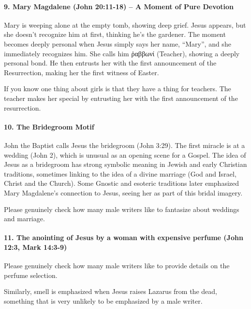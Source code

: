 \paragraph{9.
Mary Magdalene (John 20:11-18) -- A Moment of Pure Devotion}\label{par:mary-magdalene-john-2011-18-a-moment-of-pure-devotion}

Mary is weeping alone at the empty tomb, showing deep grief.
Jesus appears, but she doesn't recognize him at first, thinking he's the gardener.
The moment becomes deeply personal when Jesus simply says her name, ``Mary'', and she immediately recognizes him.
She calls him ῥαββωνί (Teacher), showing a deeply personal bond.
He then entrusts her with the first announcement of the Resurrection, making her the first witness of Easter.

If you know one thing about girls is that they have a thing for teachers.
The teacher makes her special by entrusting her with the first announcement of the resurrection.

\paragraph{10.
The Bridegroom Motif}\label{par:the-bridegroom-motif}

John the Baptist calls Jesus the bridegroom (John 3:29).
The first miracle is at a wedding (John 2), which is unusual as an opening scene for a Gospel.
The idea of Jesus as a bridegroom has strong symbolic meaning in Jewish and early Christian traditions, sometimes linking to the idea of a divine marriage (God and Israel, Christ and the Church).
Some Gnostic and esoteric traditions later emphasized Mary Magdalene's connection to Jesus, seeing her as part of this bridal imagery.

Please genuinely check how many male writers like to fantasize about weddings and marriage.

\paragraph{11.
The anointing of Jesus by a woman with expensive perfume (John 12:3, Mark 14:3-9)}\label{par:the-anointing-of-jesus-by-a-woman-with-expensive-perfume-john-123-mark-143-9}

Please genuinely check how many male writers like to provide details on the perfume selection.

Similarly, smell is emphasized when Jesus raises Lazarus from the dead, something that is very unlikely to be emphasized by a male writer.

